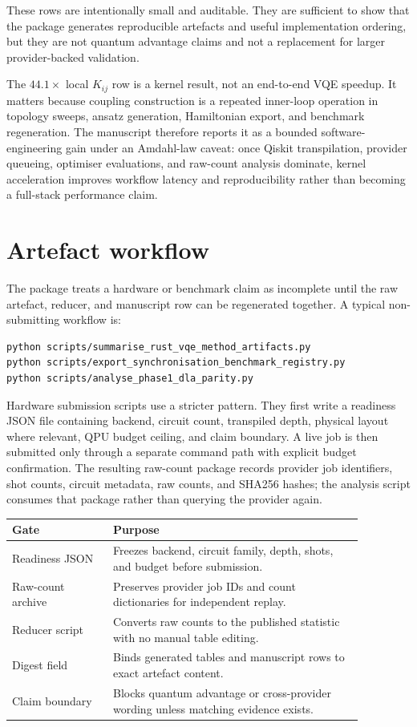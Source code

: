 \documentclass[11pt]{article}
\begin{document}
These rows are intentionally small and auditable. They are sufficient to show
that the package generates reproducible artefacts and useful implementation
ordering, but they are not quantum advantage claims and not a replacement for
larger provider-backed validation.

The $44.1\times$ local $K_{ij}$ row is a kernel result, not an end-to-end VQE
speedup. It matters because coupling construction is a repeated inner-loop
operation in topology sweeps, ansatz generation, Hamiltonian export, and
benchmark regeneration. The manuscript therefore reports it as a bounded
software-engineering gain under an Amdahl-law caveat: once Qiskit
transpilation, provider queueing, optimiser evaluations, and raw-count
analysis dominate, kernel acceleration improves workflow latency and
reproducibility rather than becoming a full-stack performance claim.

\section*{Artefact workflow}

The package treats a hardware or benchmark claim as incomplete until the raw
artefact, reducer, and manuscript row can be regenerated together. A typical
non-submitting workflow is:

\begin{verbatim}
python scripts/summarise_rust_vqe_method_artifacts.py
python scripts/export_synchronisation_benchmark_registry.py
python scripts/analyse_phase1_dla_parity.py
\end{verbatim}

Hardware submission scripts use a stricter pattern. They first write a
readiness JSON file containing backend, circuit count, transpiled depth,
physical layout where relevant, QPU budget ceiling, and claim boundary. A live
job is then submitted only through a separate command path with explicit
budget confirmation. The resulting raw-count package records provider job
identifiers, shot counts, circuit metadata, raw counts, and SHA256 hashes; the
analysis script consumes that package rather than querying the provider again.

\begin{center}
\small
\begin{tabular}{p{0.25\linewidth}p{0.62\linewidth}}
\hline
Gate & Purpose \\
\hline
Readiness JSON & Freezes backend, circuit family, depth, shots, and budget before submission. \\
Raw-count archive & Preserves provider job IDs and count dictionaries for independent replay. \\
Reducer script & Converts raw counts to the published statistic with no manual table editing. \\
Digest field & Binds generated tables and manuscript rows to exact artefact content. \\
Claim boundary & Blocks quantum advantage or cross-provider wording unless matching evidence exists. \\
\hline
\end{tabular}
\end{center}
\end{document}
